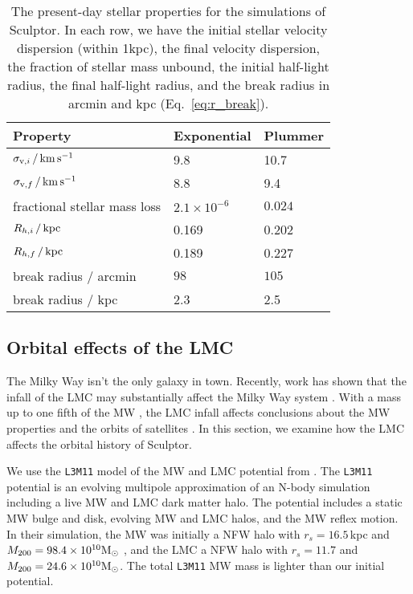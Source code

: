 \begin{table*}[t]
\centering
\caption[Simulation results for Sculptor’s stars]{The present-day stellar properties for the simulations of Sculptor. In each row, we have the initial stellar velocity dispersion (within 1kpc), the final velocity dispersion, the fraction of stellar mass unbound, the initial half-light radius, the final half-light radius, and the break radius in arcmin and kpc (Eq. \ref{eq:r_break}). }
\label{tbl:scl_sim_stars_results}
\begin{tabular}{lll}
\toprule
Property & Exponential & Plummer\\
\midrule
$\sigma_{{\rm v}, i}\,/\,{\rm km\,s^{-1}}$ & 9.8 & 10.7\\
$\sigma_{{\rm v}, f} \,/\,{\rm km\,s^{-1}}$ & 8.8 & 9.4\\
fractional stellar mass loss & $2.1\times 10^{-6}$ & $0.024$\\
$R_{h, i}\,/\,{\rm kpc}$ & 0.169 & 0.202\\
$R_{h, f}\,/\,{\rm kpc}$ & 0.189 & 0.227\\
break radius / arcmin & $98$ & $105$\\
break radius / kpc & 2.3 & 2.5\\
\bottomrule
\end{tabular}
\end{table*}

\subsection{Orbital effects of the LMC}\label{sec:scl_lmc}

The Milky Way isn't the only galaxy in town. Recently, work has shown
that the infall of the LMC may substantially affect the Milky Way system
\citep[e.g.,][]{erkal+2019, cautun+2019, garavito-camargo+2021, vasiliev2023}.
With a mass up to one fifth of the MW \citep[e.g.,][]{penarrubia+2015},
the LMC infall affects conclusions about the MW properties and the
orbits of satellites \citep[see
e.g.,][]{patel+2020, battaglia+2022, correamagnus+vasiliev2022}. In this
section, we examine how the LMC affects the orbital history of Sculptor.

We use the \texttt{L3M11} model of the MW and LMC potential from
\citet{vasiliev2024}. The \texttt{L3M11} potential is an evolving
multipole approximation of an N-body simulation including a live MW and
LMC dark matter halo. The potential includes a static MW bulge and disk,
evolving MW and LMC halos, and the MW reflex motion. In their
simulation, the MW was initially a NFW halo with \(r_s=16.5\,\)kpc and
\(M_{\rm 200}= 98.4\times10^{10}{\rm M}_{\odot}\) , and the LMC a NFW halo with
\(r_s=11.7\) and \(M_{200} = 24.6 \times 10^{10} {\rm M}_{\odot}\). The total
\texttt{L3M11} MW mass is lighter than our initial \citet{EP2020}
potential.

